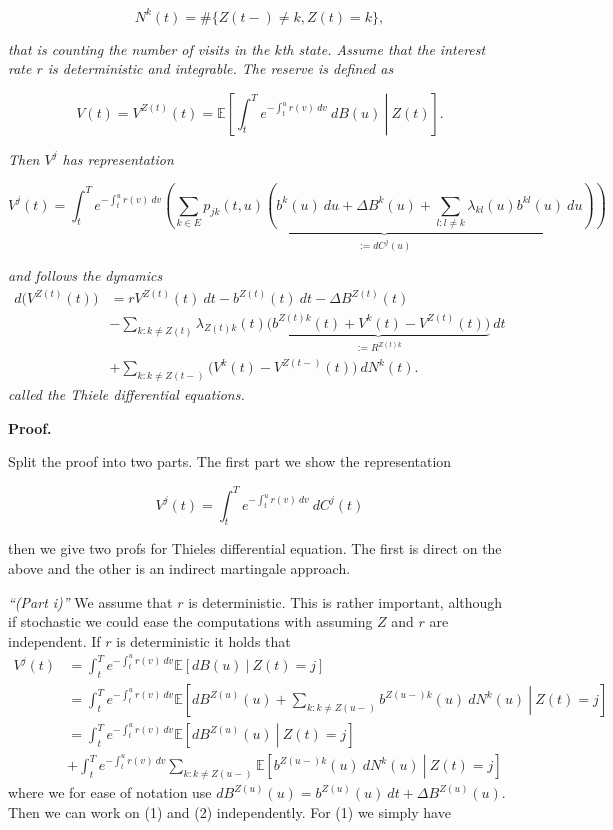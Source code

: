 \documentclass[a4paper,10pt,openany]{book}
\begin{document}
\[
N^k(t)=\#\{Z(t-)\ne k,Z(t)=k\},
\]

\emph{that is counting the number of visits in the \(k\)th state. Assume that the interest rate \(r\) is deterministic and integrable. The reserve is defined as}

\[
V(t)=V^{Z(t)}(t)=\mathbb E\left[\left.\int_t^Te^{-\int_t^u r(v)\ dv}\ dB(u)\ \right\vert\ Z(t)\right].
\]

\emph{Then \(V^j\) has representation}

\[
V^j(t)=\int_t^Te^{-\int_t^ur(v)\ dv}\underbrace{\left(\sum_{k\in E}p_{jk}(t,u)\left(b^k(u)\ du+\Delta B^k(u)+\sum_{l:l\ne k}\lambda_{kl}(u)b^{kl}(u)\ du\right)\right)}_{:= dC^j(u)}
\]

\emph{and follows the dynamics}
\begin{align*}
d\Big(V^{Z(t)}(t)\Big)&=rV^{Z(t)}(t)\ dt-b^{Z(t)}(t)\ dt -\Delta B^{Z(t)}(t)\\
&-\sum_{k : k\ne Z(t)}\lambda_{Z(t)k}(t)\underbrace{\Big(b^{Z(t)k}(t)+V^k(t)-V^{Z(t)}(t)\Big)}_{:=R^{Z(t)k}}\ dt\\
&+\sum_{k : k\ne Z(t-)}\Big(V^k(t)-V^{Z(t-)}(t)\Big)\ dN^k(t).
\end{align*}
\emph{called the Thiele differential equations.}

\textbf{Proof.}

Split the proof into two parts. The first part we show the representation

\[
V^j(t)=\int_t^Te^{-\int_t^ur(v)\ dv}\ dC^j(t)
\]

then we give two profs for Thieles differential equation. The first is direct on the above and the other is an indirect martingale approach.

\emph{``(Part i)''} We assume that \(r\) is deterministic. This is rather important, although if stochastic we could ease the computations with assuming \(Z\) and \(r\) are independent. If \(r\) is deterministic it holds that
\begin{align*}
V^j(t)&=\int_t^Te^{-\int_t^ur(v)\ dv}\mathbb E\left[\left.dB(u) \ \right\vert\ Z(t)= j\right]\\
&=\int_t^Te^{-\int_t^ur(v)\ dv}\mathbb E\left[\left. dB^{Z(u)}(u)+\sum_{k:k\ne Z(u-)}b^{Z(u-)k}(u)\ dN^k(u) \ \right\vert\ Z(t)= j\right]\\
&=\int_t^Te^{-\int_t^ur(v)\ dv}\mathbb E\left[\left. dB^{Z(u)}(u) \ \right\vert\ Z(t)= j\right]\tag{1}\\
&+\int_t^Te^{-\int_t^ur(v)\ dv}\sum_{k:k\ne Z(u-)}\mathbb E\left[\left. b^{Z(u-)k}(u)\ dN^k(u) \ \right\vert\ Z(t)= j\right]\tag{2}
\end{align*}
where we for ease of notation use \(dB^{Z(u)}(u)=b^{Z(u)}(u)\ dt+\Delta B^{Z(u)}(u)\). Then we can work on (1) and (2) independently. For (1) we simply have
\end{document}
